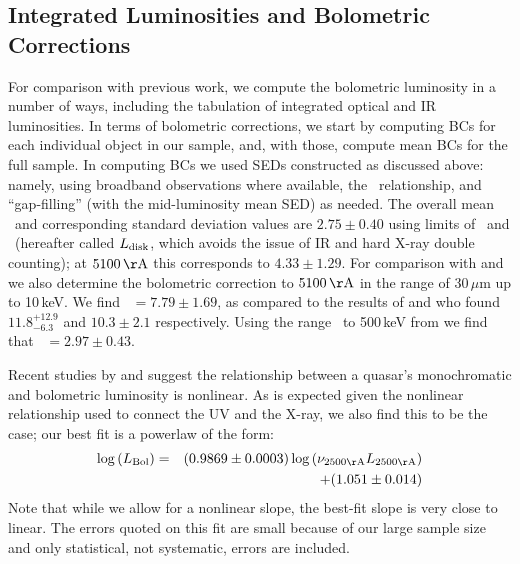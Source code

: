 \subsection{Integrated Luminosities and Bolometric Corrections} \label{BCs}

For comparison with previous work, we compute the bolometric luminosity in a number of ways, including the tabulation of integrated optical and IR luminosities.    In terms of bolometric corrections, we start by computing BCs for each individual object in our sample, and, with those, compute mean BCs for the full sample.  In computing BCs we used SEDs constructed as discussed above: namely, using broadband observations where available, the \luvaox\ relationship, and ``gap-filling'' (with the mid-luminosity mean SED) as needed.  The overall mean \bctwofive\ and corresponding standard deviation values are $2.75 \pm 0.40$ using limits of \onemum\ and \twokev\ (hereafter called $L_{\rm disk}$, which avoids the issue of IR and hard X-ray double counting); at $5100\,{\rm \AA}$ this corresponds to $4.33 \pm 1.29$.  For comparison with \citet{Elvis:1994} and \citet{Richards:2006} we also determine the bolometric correction to $5100\,{\rm \AA}$ in the range of 30\,$\mu$m up to 10\,keV. We find \bcfiveone\ $=7.79 \pm 1.69$, as compared to the results of \citet{Elvis:1994} and \citet{Richards:2006} who found $11.8^{+12.9}_{-6.3}$ and $10.3 \pm 2.1$ respectively.  Using the range \onemum\ to 500\,keV from \citet{Marconi:2004} we find that \bctwofive\ $=2.97 \pm 0.43$.

Recent studies by \citet{Nemmen:2010} and \citet{Runnoe:2012} suggest the relationship between a quasar's monochromatic and bolometric luminosity is nonlinear.  As is expected given the nonlinear relationship used to connect the UV and the X-ray, we also find this to be the case; our best fit is a powerlaw of the form:
\begin{eqnarray}
 \log{(L_{{\rm Bol}})}=&&(0.9869 \pm 0.0003)\log{(\nu_{2500{\rm \AA}} L_{2500{\rm \AA}})}\nonumber \\
  	&&+ (1.051 \pm 0.014)
 \label{Lbol_v_Luv}
\end{eqnarray}
Note that while we allow for a nonlinear slope, the best-fit slope is very close to linear. The errors quoted on this fit are small because of our large sample size and only statistical, not systematic, errors are included.

